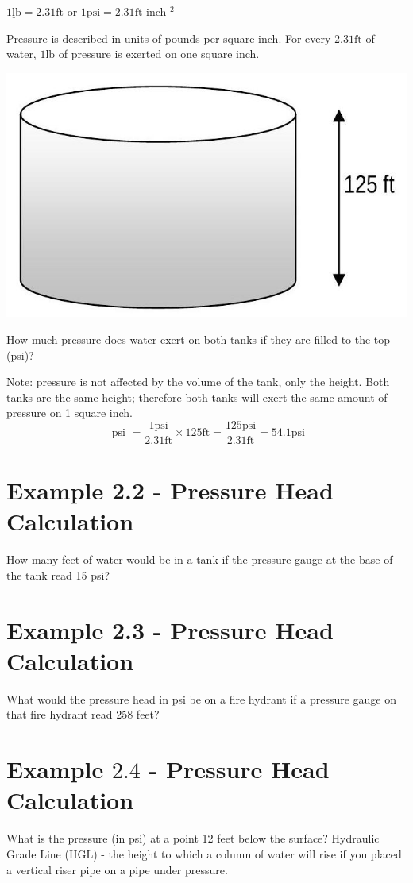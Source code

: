 \documentclass[10pt]{article}
\begin{document}
$\underline{1 \mathrm{lb}}=2.31 \mathrm{ft}$ or $1 \mathrm{psi}=2.31 \mathrm{ft}$ inch $^{2}$

Pressure is described in units of pounds per square inch. For every $2.31 \mathrm{ft}$ of water, $1 \mathrm{lb}$ of pressure is exerted on one square inch.

\includegraphics[max width=\textwidth]{2022_10_30_098bb5f44c5986ff92a9g-29}

How much pressure does water exert on both tanks if they are filled to the top (psi)?

Note: pressure is not affected by the volume of the tank, only the height. Both tanks are the same height; therefore both tanks will exert the same amount of pressure on 1 square inch.
$$
\text { psi }=\frac{1 \mathrm{psi}}{2.31 \mathrm{ft}} \times \underline{125 \mathrm{ft}}=\frac{125 \mathrm{psi}}{2.31 \mathrm{ft}}=54.1 \mathrm{psi}
$$

\section{Example 2.2 - Pressure Head Calculation}
How many feet of water would be in a tank if the pressure gauge at the base of the tank read 15 psi?

\section{Example 2.3 - Pressure Head Calculation}
What would the pressure head in psi be on a fire hydrant if a pressure gauge on that fire hydrant read 258 feet?

\section{Example $2.4$ - Pressure Head Calculation}
What is the pressure (in psi) at a point 12 feet below the surface? Hydraulic Grade Line (HGL) - the height to which a column of water will rise if you placed a vertical riser pipe on a pipe under pressure.
\end{document}

